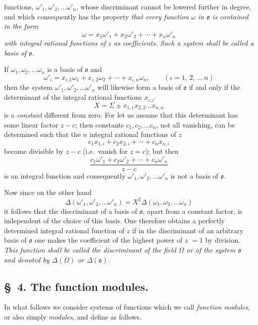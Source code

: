 \documentclass{article}
\begin{document}
functions, $\omega'_{1}, \omega'_{2}, \ldots \omega'_{n}$, whose discriminant cannot be lowered further in degree, and which consequently has the property \emph{that every function $\omega$ in $\mathfrak{o}$ is contained in the form}
\[ \omega = x_{1}\omega'_{1} + x_{2}\omega'_{2} + \cdots + x_{n}\omega'_{n} \]
\emph{with integral rational functions of $z$ as coefficients. Such a system shall be called a basis of $\mathfrak{o}$.}

If $\omega_{1}, \omega_{2}, \ldots \omega_{n}$ is a basis of $\mathfrak{o}$ and
\[ \omega'_{\iota} = x_{\iota,1}\omega_{1} + x_{\iota,2}\omega_{2} + \cdots + x_{\iota,n}\omega_{n}, \qquad {\scriptstyle (\iota = 1,\, 2,\, \ldots\, n)} \]
then the system $\omega'_{1}, \omega'_{2}, \ldots \omega'_{n}$ will likewise form a basis of $\mathfrak{o}$ if and only if the determinant of the integral rational functions $x_{\iota,\iota'}$
\[ X = \Sigma \pm x_{1,1}x_{2,2}\ldots x_{n,n} \]
is a \emph{constant} different from zero. For let us assume that this determinant has some linear factor $z-c$; then constants $c_{1}, c_{2}, \ldots c_{n}$, not all vanishing, can be determined such that the $n$ integral rational functions of $z$
\[ c_{1}x_{1,\iota} + c_{2}x_{2,\iota} + \cdots + c_{n}x_{n,\iota} \]
become divisible by $z-c$ (i.e.\ vanish for $z = c$); but then
\[ \frac{c_{1}\omega'_{1} + c_{2}\omega'_{2} + \cdots + c_{n}\omega'_{n}}{z-c} \]
is an integral function and consequently $\omega'_{1}, \omega'_{2}, \ldots \omega'_{n}$ is not a basis of $\mathfrak{o}$.

Now since on the other hand
\[ \Delta(\omega'_{1}, \omega'_{2}, \ldots \omega'_{n}) = X^{2}\Delta(\omega_{1}, \omega_{2}, \ldots \omega_{n}) \]
it follows that the discriminant of a basis of $\mathfrak{o}$, apart from a constant factor, is independent of the choice of this basis. One therefore obtains a perfectly determined integral rational function of $z$ if in the discriminant of an arbitrary basis of $\mathfrak{o}$ one makes the coefficient of the highest power of $z$ $= 1$ by division. \emph{This function shall be called the discriminant of the field $\Omega$ or of the system $\mathfrak{o}$ and denoted by $\Delta(\Omega)$ or $\Delta(\mathfrak{o})$.}

\subsection*{§~4. The function modules.}

In what follows we consider systems of functions which we call \emph{function modules}, or also simply \emph{modules}, and define as follows.
\end{document}
